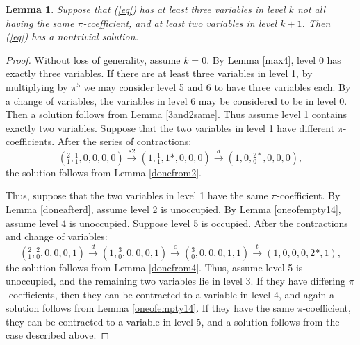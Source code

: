 \documentclass{article}
\newtheorem{lemma}{Lemma}
\begin{document}
\begin{lemma} \label{3diffthen2}
Suppose that (\ref{eq}) has at least three variables in level $k$ not all having the same $\pi$-coefficient, and at least two variables in level $k+1$.  Then (\ref{eq}) has a nontrivial solution.
\end{lemma}
\begin{proof}
Without loss of generality, assume $k=0$.  By Lemma \ref{max4}, level 0 has exactly three variables.  If there are at least three variables in level 1, by multiplying by $\pi^5$ we may consider level 5 and 6 to have three variables each.  By a change of variables, the variables in level 6 may be considered to be in level 0.  Then a solution follows from Lemma \ref{3and2same}.  Thus assume level 1 contains exactly two variables. Suppose that the two variables in level 1 have different $\pi$-coefficients.  After the series of contractions:
$$({}^{2}_{1},{}^{1}_{1},0,0,0,0) \xrightarrow{s2} (1,{}^{1}_{1},1*,0,0,0) \xrightarrow{d} (1,0,{}^{2*}_{0},0,0,0),$$
the solution follows from Lemma \ref{donefrom2}.

Thus, suppose that the two variables in level 1 have the same $\pi$-coefficient.  By Lemma \ref{doneafterd}, assume level 2 is unoccupied.  By Lemma \ref{oneofempty14}, assume level 4 is unoccupied.  Suppose level 5 is occupied.  After the contractions and change of variables:
$$({}^{2}_{1},{}^{2}_{0},0,0,0,1) \xrightarrow{d} (1,{}^{3}_{0},0,0,0,1) \xrightarrow{c}
({}^{3}_{0},0,0,0,1,1) \xrightarrow{t}
(1,0,0,0,2*,1),$$
the solution follows from Lemma \ref{donefrom4}.  Thus, assume level 5 is unoccupied, and the remaining two variables lie in level 3.  If they have differing $\pi$-coefficients, then they can be contracted to a variable in level 4, and again a solution follows from Lemma \ref{oneofempty14}.  If they have the same $\pi$-coefficient, they can be contracted to a variable in level 5, and a solution follows from the case described above.
\end{proof}
\end{document}
